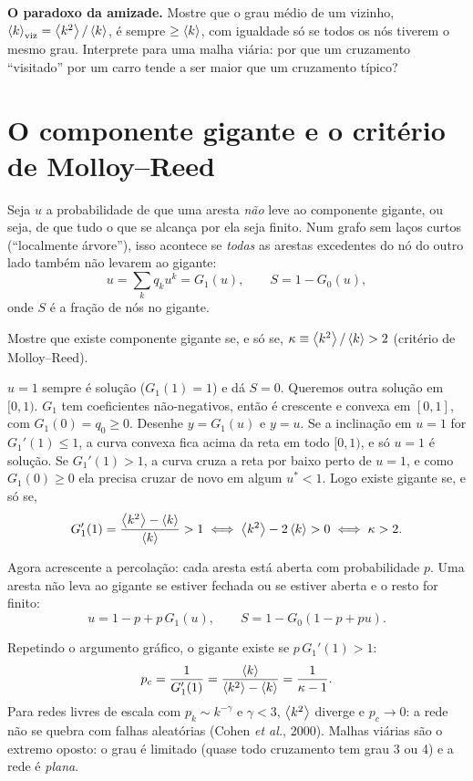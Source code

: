 \documentclass[11pt]{article}
\begin{document}
 \textbf{O paradoxo da amizade.} Mostre que o grau médio de um vizinho, $\left\langle k \right\rangle_{\rm viz} = \left\langle k^2 \right\rangle/\left\langle k \right\rangle$, é sempre $\ge\left\langle k \right\rangle$, com igualdade só se todos os nós tiverem o mesmo grau. Interprete para uma malha viária: por que um cruzamento ``visitado'' por um carro tende a ser maior que um cruzamento típico?

\section{O componente gigante e o critério de Molloy--Reed}

Seja $u$ a probabilidade de que uma aresta \emph{não} leve ao componente gigante, ou seja, de que tudo o que se alcança por ela seja finito. Num grafo sem laços curtos (``localmente árvore''), isso acontece se \emph{todas} as arestas excedentes do nó do outro lado também não levarem ao gigante:
\[
u = \sum_k q_k u^k = G_1(u), \qquad S = 1 - G_0(u),
\]
onde $S$ é a fração de nós no gigante.

\begin{exemplo}
Mostre que existe componente gigante se, e só se, $\kappa\equiv\left\langle k^2 \right\rangle/\left\langle k \right\rangle > 2$ (critério de Molloy--Reed).
\end{exemplo}
\begin{solucao}
$u=1$ sempre é solução ($G_1(1)=1$) e dá $S=0$. Queremos outra solução em $[0,1)$. $G_1$ tem coeficientes não-negativos, então é crescente e convexa em $[0,1]$, com $G_1(0) = q_0\ge0$. Desenhe $y=G_1(u)$ e $y=u$. Se a inclinação em $u=1$ for $G_1'(1)\le1$, a curva convexa fica acima da reta em todo $[0,1)$, e só $u=1$ é solução. Se $G_1'(1)>1$, a curva cruza a reta por baixo perto de $u=1$, e como $G_1(0)\ge0$ ela precisa cruzar de novo em algum $u^*<1$. Logo existe gigante se, e só se,
\[
G_1'(1) = \frac{\left\langle k^2 \right\rangle-\left\langle k \right\rangle}{\left\langle k \right\rangle} > 1 \iff \left\langle k^2 \right\rangle - 2\left\langle k \right\rangle > 0 \iff \kappa > 2.
\]
\end{solucao}

Agora acrescente a percolação: cada aresta está aberta com probabilidade $p$. Uma aresta não leva ao gigante se estiver fechada ou se estiver aberta e o resto for finito:
\[
u = 1-p+p\,G_1(u),\qquad S = 1-G_0(1-p+pu).
\]

\begin{ideia}
Repetindo o argumento gráfico, o gigante existe se $p\,G_1'(1) > 1$:
\[
p_c = \frac{1}{G_1'(1)} = \frac{\left\langle k \right\rangle}{\left\langle k^2 \right\rangle-\left\langle k \right\rangle} = \frac{1}{\kappa-1}.
\]
Para redes livres de escala com $p_k\sim k^{-\gamma}$ e $\gamma<3$, $\left\langle k^2 \right\rangle$ diverge e $p_c\to0$: a rede não se quebra com falhas aleatórias (Cohen \emph{et al.}, 2000). Malhas viárias são o extremo oposto: o grau é limitado (quase todo cruzamento tem grau 3 ou 4) e a rede é \emph{plana}.
\end{ideia}
\end{document}
